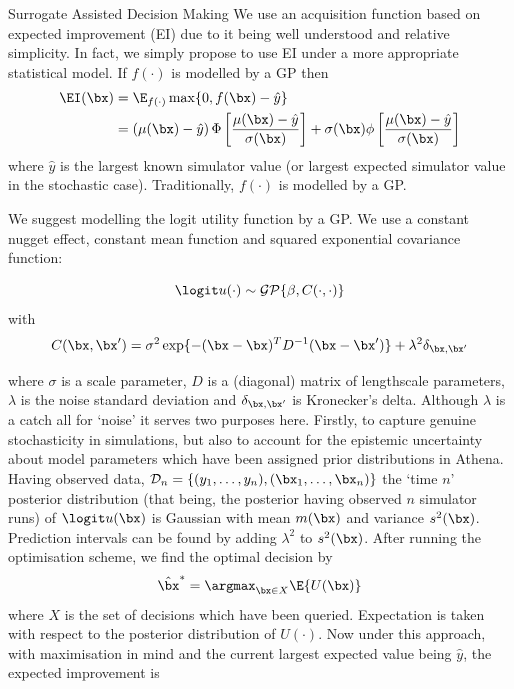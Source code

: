 \begin{chapter}{Surrogate Assisted Decision Making \label{Chap:optimisation}}
We use an acquisition function based on expected improvement (EI) due to it being well understood and relative simplicity. In fact, we simply propose to use EI under a more appropriate statistical model.
If $f(\cdot)$ is modelled by a GP then
\begin{align}
  \EI (\bx) &= \E_{f(\cdot)} \max \{0,  f(\bx) - \hat{y} \}\\
    &= \left( \mu(\bx) - \hat{y} \right) \Phi \left[ \frac{\mu(\bx) - \hat{y}}{\sigma(\bx)} \right]  + \sigma(\bx) \phi \left[ \frac{\mu(\bx) - \hat{y}}{\sigma(\bx)}\right]
\end{align}
where $\hat{y}$ is the largest known simulator value (or largest expected simulator value in the stochastic case). Traditionally, $f(\cdot)$ is modelled by a GP.

  We suggest modelling the logit utility function by a GP. We use a constant nugget effect, constant mean function and squared exponential covariance function:

\begin{equation}
  \logit u(\cdot) \sim \mathcal{GP} \{ \beta, C(\cdot, \cdot) \}
\end{equation}
with
\begin{equation}
  C(\bx, \bx') = \sigma^2 \exp \{ -(\bx - \bx)^T D^{-1} (\bx - \bx') \} + \lambda^2 \delta_{\bx , \bx'}
\end{equation}

where $\sigma$ is a scale parameter, $D$ is a (diagonal) matrix of lengthscale parameters, $\lambda$ is the noise standard deviation and $\delta_{\bx, \bx'}$ is Kronecker's delta. Although $\lambda$ is a catch all for `noise' it serves two purposes here. Firstly, to capture genuine stochasticity in simulations, but also to account for the epistemic uncertainty about model parameters which have been assigned prior distributions in Athena. Having observed data, $\mathcal{D}_n = \{ (y_1, \ldots, y_n), (\bx_1, \ldots, \bx_n)\}$ the `time $n$' posterior distribution (that being, the posterior having observed $n$ simulator runs) of $\logit u(\bx)$ is Gaussian with mean $m(\bx)$ and variance $s^2(\bx)$. Prediction intervals can be found by adding $\lambda^2$ to $s^2(\bx)$. After running the optimisation scheme, we find the optimal decision by
\begin{equation}
  \hat{\bx}^{*} = \argmax_{\bx \in X} \E \{ U(\bx) \}
\end{equation}
where $X$ is the set of decisions which have been queried. Expectation is taken with respect to the posterior distribution of $U(\cdot)$.
Now under this approach, with maximisation in mind and the current largest expected value being $\hat{y}$,  the expected improvement is


\end{chapter}
